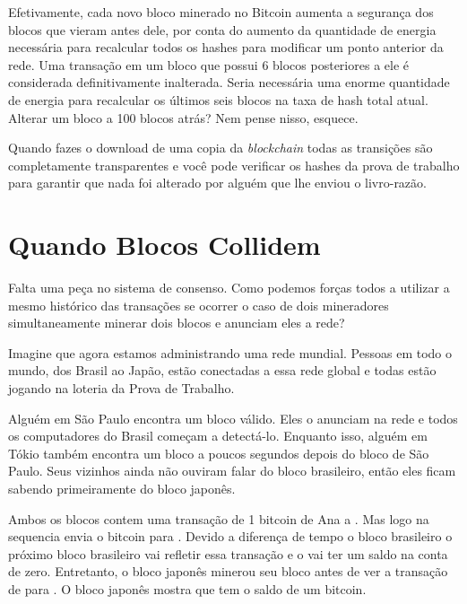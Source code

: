 Efetivamente, cada novo bloco minerado no Bitcoin aumenta a segurança dos blocos que vieram antes dele, por conta do aumento da quantidade de energia necessária para recalcular todos os hashes para modificar um ponto anterior da rede.
Uma transação em um bloco que possui 6 blocos posteriores a ele é considerada definitivamente inalterada. 
Seria necessária uma enorme quantidade de energia para recalcular os últimos seis blocos na taxa de hash total atual.
Alterar um bloco a 100 blocos atrás? Nem pense nisso, esquece.

Quando fazes o download de uma copia da \textit{blockchain}  todas as transições são completamente transparentes e você pode verificar os hashes da prova de trabalho para garantir que nada foi alterado por alguém que lhe enviou o livro-razão.


\section*{Quando Blocos Collidem}%


Falta uma peça no sistema de consenso. 
Como podemos forças todos a utilizar a mesmo histórico das transações se ocorrer o caso de dois mineradores simultaneamente minerar dois blocos e anunciam eles a rede?

Imagine que agora estamos administrando uma rede mundial. Pessoas em todo o mundo, dos Brasil ao Japão, estão conectadas a essa rede global e todas estão jogando na loteria da Prova de Trabalho.

Alguém em São Paulo encontra um bloco válido. Eles o anunciam na rede e todos os computadores do Brasil começam a detectá-lo. Enquanto isso, alguém em Tókio também encontra um bloco a poucos segundos depois do bloco de São Paulo. Seus vizinhos ainda não ouviram falar do bloco brasileiro, então eles ficam sabendo primeiramente do bloco japonês.

Ambos os blocos contem uma transação de 1 bitcoin de Ana a \TraducaoNomeB. Mas logo na sequencia \TraducaoNomeB{} envia o bitcoin para \TraducaoNomeC. Devido a diferença de tempo o bloco brasileiro o próximo bloco brasileiro vai refletir essa transação e o \TraducaoNomeB{} vai ter um saldo na conta de zero. Entretanto, o bloco japonês minerou seu bloco antes de ver a transação de \TraducaoNomeB{} para \TraducaoNomeC. O bloco japonês mostra que \TraducaoNomeB{} tem o saldo de um bitcoin.

